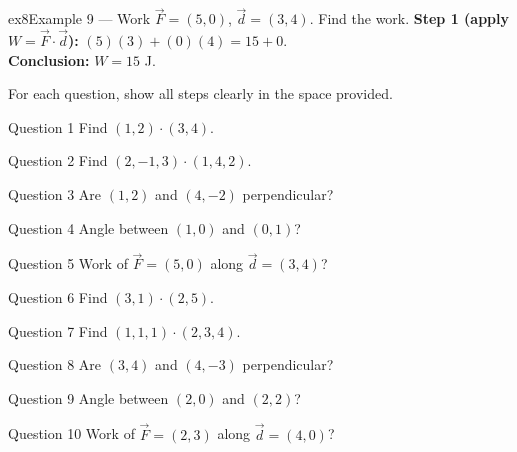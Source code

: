 \documentclass[11pt]{article}
\begin{document}
\begin{example}{ex8}{Example 9 --- Work}
$\vec F=(5,0)$, $\vec d=(3,4)$. Find the work.\soln
\textbf{Step 1 (apply $W=\vec F\cdot\vec d$):} $(5)(3)+(0)(4)=15+0$.\\[3pt]
\textbf{Conclusion:} $W=15$ J.
\end{example}

\clearpage
{}
For each question, show all steps clearly in the space provided.

\begin{qbox}{Question 1}
Find $(1,2)\cdot(3,4)$.\workspace{2.4cm}
\end{qbox}

\begin{qbox}{Question 2}
Find $(2,-1,3)\cdot(1,4,2)$.\workspace{2.4cm}
\end{qbox}

\begin{qbox}{Question 3}
Are $(1,2)$ and $(4,-2)$ perpendicular?\workspace{2.4cm}
\end{qbox}

\begin{qbox}{Question 4}
Angle between $(1,0)$ and $(0,1)$?\workspace{2.4cm}
\end{qbox}

\begin{qbox}{Question 5}
Work of $\vec F=(5,0)$ along $\vec d=(3,4)$?\workspace{2.4cm}
\end{qbox}

\begin{qbox}{Question 6}
Find $(3,1)\cdot(2,5)$.\workspace{2.4cm}
\end{qbox}

\begin{qbox}{Question 7}
Find $(1,1,1)\cdot(2,3,4)$.\workspace{2.4cm}
\end{qbox}

\begin{qbox}{Question 8}
Are $(3,4)$ and $(4,-3)$ perpendicular?\workspace{2.4cm}
\end{qbox}

\begin{qbox}{Question 9}
Angle between $(2,0)$ and $(2,2)$?\workspace{2.4cm}
\end{qbox}

\begin{qbox}{Question 10}
Work of $\vec F=(2,3)$ along $\vec d=(4,0)$?\workspace{2.4cm}
\end{qbox}
\end{document}
